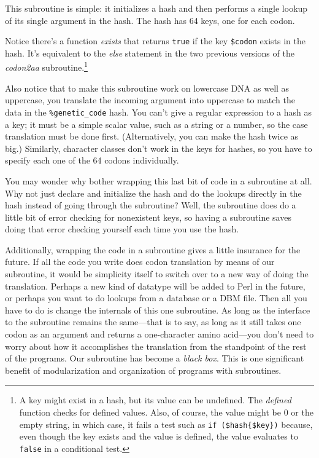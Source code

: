 This subroutine is simple: it initializes a hash and then performs a single lookup of its single argument in the hash. The hash has 64 keys, one for each codon.

Notice there's a function \textit{exists} that returns \verb|true| if the key \verb|$codon| exists in the hash. It's equivalent to the \textit{else} statement in the two previous versions of the \textit{codon2aa} subroutine.\footnote{A key might exist in a hash, but its value can be undefined. The \textit{defined} function checks for defined values. Also, of course, the value might be 0 or the empty string, in which case, it fails a test such as \verb|if ($hash{$key})| because, even though the key exists and the value is defined, the value evaluates to \verb|false| in a conditional test.}

Also notice that to make this subroutine work on lowercase DNA as well as uppercase, you translate the incoming argument into uppercase to match the data in the \verb|%genetic_code| hash. You can't give a regular expression to a hash as a key; it must be a simple scalar value, such as a string or a number, so the case translation must be done first. (Alternatively, you can make the hash twice as big.) Similarly, character classes don't work in the keys for hashes, so you have to specify each one of the 64 codons individually.

You may wonder why bother wrapping this last bit of code in a subroutine at all. Why not just declare and initialize the hash and do the lookups directly in the hash instead of going through the subroutine? Well, the subroutine does do a little bit of error checking for nonexistent keys, so having a subroutine saves doing that error checking yourself each time you use the hash.

Additionally, wrapping the code in a subroutine gives a little insurance for the future. If all the code you write does codon translation by means of our subroutine, it would be simplicity itself to switch over to a new way of doing the translation. Perhaps a new kind of datatype will be added to Perl in the future, or perhaps you want to do lookups from a database or a DBM file. Then all you have to do is change the internals of this one subroutine. As long as the interface to the subroutine remains the same—that is to say, as long as it still takes one codon as an argument and returns a one-character amino acid—you don't need to worry about how it accomplishes the translation from the standpoint of the rest of the programs. Our subroutine has become a \textit{black box}. This is one significant benefit of modularization and organization of programs with subroutines. 

